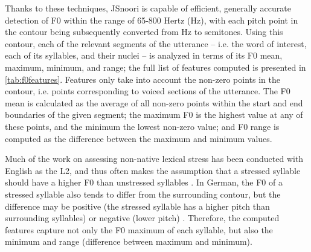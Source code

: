 	Thanks to these techniques, JSnoori is capable of efficient, generally accurate detection of F0 
	within the range of 65-800 Hertz (Hz), with each pitch point in the contour being subsequently converted from Hz to semitones.
	Using this contour, each of the relevant segments of the utterance -- i.e. the word of interest, each of its syllables, and their nuclei -- is analyzed in terms of its F0 mean, maximum, minimum, and range;
	the full list of features computed is presented in \cref{tab:f0features}.
	Features only take into account the non-zero points in the contour, i.e. points corresponding to voiced sections of the utterance. The F0 mean is calculated as the average of all non-zero points within the start and end boundaries of the given segment; the maximum F0 is the highest value at any of these points, and the minimum the lowest non-zero value; and F0 range is computed as the difference between the maximum and minimum values. 
	
	
	Much of the work on assessing non-native lexical stress has been conducted with English as the L2, and thus often makes the assumption that a stressed syllable should have a higher F0 than unstressed syllables \citep{Bonneau2011}. In German, the F0 of a stressed syllable also tends to differ from the surrounding contour, but the difference may be positive (the stressed syllable has a higher pitch than surrounding syllables) or negative (lower pitch) \citep[p.~267]{Cutler2005}. 		%
	Therefore, the computed features
	capture not only the F0 maximum of each syllable, but also the minimum and range (difference between maximum and minimum). %
	 
	


